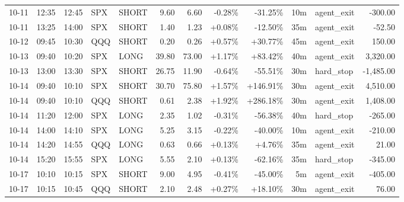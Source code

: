 \documentclass[11pt,a4paper,twoside]{article}
\begin{document}
\begin{center}
\begin{longtable}{>{\color{txtmain}}l l l l l r r r r r >{\color{txtmain}}l r}
10-11 & 12:35 & 12:45 & SPX & SHORT & 9.60 & 6.60 & \textcolor{lossred}{-0.28\%} & \textcolor{lossred}{-31.25\%} & 10m & agent\_exit & \textcolor{lossred}{-300.00} \\
10-11 & 13:25 & 14:00 & SPX & SHORT & 1.40 & 1.23 & \textcolor{wingreen}{+0.08\%} & \textcolor{lossred}{-12.50\%} & 35m & agent\_exit & \textcolor{lossred}{-52.50} \\
10-12 & 09:45 & 10:30 & QQQ & SHORT & 0.20 & 0.26 & \textcolor{wingreen}{+0.57\%} & \textcolor{wingreen}{+30.77\%} & 45m & agent\_exit & \textcolor{wingreen}{150.00} \\
10-13 & 09:40 & 10:20 & SPX & LONG & 39.80 & 73.00 & \textcolor{wingreen}{+1.17\%} & \textcolor{wingreen}{+83.42\%} & 40m & agent\_exit & \textcolor{wingreen}{3,320.00} \\
10-13 & 13:00 & 13:30 & SPX & SHORT & 26.75 & 11.90 & \textcolor{lossred}{-0.64\%} & \textcolor{lossred}{-55.51\%} & 30m & hard\_stop & \textcolor{lossred}{-1,485.00} \\
10-14 & 09:40 & 10:10 & SPX & SHORT & 30.70 & 75.80 & \textcolor{wingreen}{+1.57\%} & \textcolor{wingreen}{+146.91\%} & 30m & agent\_exit & \textcolor{wingreen}{4,510.00} \\
10-14 & 09:40 & 10:10 & QQQ & SHORT & 0.61 & 2.38 & \textcolor{wingreen}{+1.92\%} & \textcolor{wingreen}{+286.18\%} & 30m & agent\_exit & \textcolor{wingreen}{1,408.00} \\
10-14 & 11:20 & 12:00 & SPX & LONG & 2.35 & 1.02 & \textcolor{lossred}{-0.31\%} & \textcolor{lossred}{-56.38\%} & 40m & hard\_stop & \textcolor{lossred}{-265.00} \\
10-14 & 14:00 & 14:10 & SPX & LONG & 5.25 & 3.15 & \textcolor{lossred}{-0.22\%} & \textcolor{lossred}{-40.00\%} & 10m & agent\_exit & \textcolor{lossred}{-210.00} \\
10-14 & 14:20 & 14:55 & QQQ & LONG & 0.63 & 0.66 & \textcolor{wingreen}{+0.13\%} & \textcolor{wingreen}{+4.76\%} & 35m & agent\_exit & \textcolor{wingreen}{21.00} \\
10-14 & 15:20 & 15:55 & SPX & LONG & 5.55 & 2.10 & \textcolor{wingreen}{+0.13\%} & \textcolor{lossred}{-62.16\%} & 35m & hard\_stop & \textcolor{lossred}{-345.00} \\
10-17 & 10:10 & 10:15 & SPX & SHORT & 9.00 & 4.95 & \textcolor{lossred}{-0.41\%} & \textcolor{lossred}{-45.00\%} & 5m & agent\_exit & \textcolor{lossred}{-405.00} \\
10-17 & 10:15 & 10:45 & QQQ & SHORT & 2.10 & 2.48 & \textcolor{wingreen}{+0.27\%} & \textcolor{wingreen}{+18.10\%} & 30m & agent\_exit & \textcolor{wingreen}{76.00} \\

\end{longtable}
\end{center}
\end{document}
